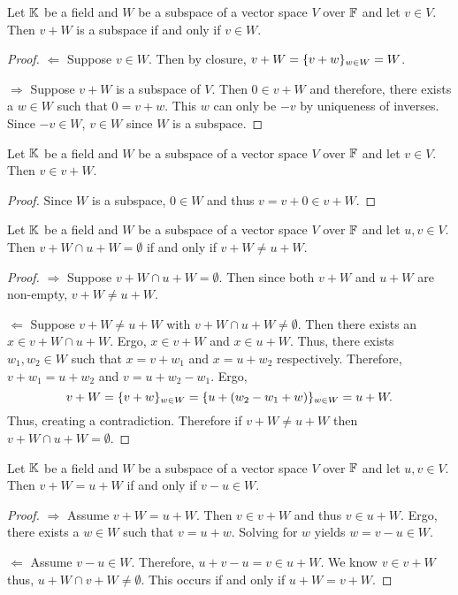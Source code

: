 \begin{proposition}
	Let $\mathbb{K}$ be a field and $W$ be a subspace of a vector space $V$ over $\mathbb{F}$ and let $v\in V$.
	Then $v+W$ is a subspace if and only if $v\in W$.
\end{proposition}
\begin{proof}
	$\Leftarrow$ Suppose $v\in W$.
	Then by closure, $v+W=\lbrace v+w \rbrace_{w\in W}=W$.

	$\Rightarrow$ Suppose $v+W$ is a subspace of $V$.
	Then $0\in v+W$ and therefore, there exists a $w\in W$ such that $0=v+w$.
	This $w$ can only be $-v$ by uniqueness of inverses.
	Since $-v\in W$, $v\in W$ since $W$ is a subspace.
\end{proof}

\begin{proposition}
	Let $\mathbb{K}$ be a field and $W$ be a subspace of a vector space $V$ over $\mathbb{F}$ and let $v\in V$.
	Then $v\in v+W$.
\end{proposition}
\begin{proof}
	Since $W$ is a subspace, $0\in W$ and thus $v=v+0\in v+W$.
\end{proof}

\begin{proposition}
	Let $\mathbb{K}$ be a field and $W$ be a subspace of a vector space $V$ over $\mathbb{F}$ and let $u,v\in V$.
	Then $v+W\cap u+W=\emptyset$ if and only if $v+W\neq u+W$.
\end{proposition}
\begin{proof}
	$\Rightarrow$ Suppose $v+W\cap u+W=\emptyset$.
	Then since both $v+W$ and $u+W$ are non-empty, $v+W\neq u+W$.

	$\Leftarrow$ Suppose $v+W\neq u+W$ with $v+W\cap u+W\neq\emptyset$.
	Then there exists an $x\in v+W\cap u+W$.
	Ergo, $x\in v+W$ and $x\in u+W$.
	Thus, there exists $w_1,w_2\in W$ such that $x=v+w_1$ and $x=u+w_2$ respectively.
	Therefore, $v+w_1=u+w_2$ and $v=u+w_2-w_1$.
	Ergo,
	\[
		v+W=\lbrace v+w \rbrace_{w\in W}=\lbrace u+(w_2-w_1+w) \rbrace_{w\in W}=u+W.
	\]
	Thus, creating a contradiction.
	Therefore if $v+W\neq u+W$ then $v+W\cap u+W=\emptyset$.
\end{proof}

\begin{proposition}
	Let $\mathbb{K}$ be a field and $W$ be a subspace of a vector space $V$ over $\mathbb{F}$ and let $u,v\in V$.
	Then $v+W=u+W$ if and only if $v-u\in W$.
\end{proposition}
\begin{proof}
	$\Rightarrow$ Assume $v+W=u+W$.
	Then $v\in v+W$ and thus $v\in u+W$.
	Ergo, there exists a $w\in W$ such that $v=u+w$.
	Solving for $w$ yields $w=v-u\in W$.

	$\Leftarrow$ Assume $v-u\in W$.
	Therefore, $u+v-u=v\in u+W$.
	We know $v\in v+W$ thus, $u+W\cap v+W\neq\emptyset$.
	This occurs if and only if $u+W=v+W$.
\end{proof}

